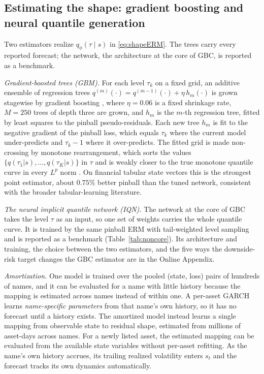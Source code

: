 \documentclass[11pt]{article}
\theoremstyle{remark}
\begin{document}
\subsection{Estimating the shape: gradient boosting and neural quantile
generation}\label{sec:gbcmethod}

Two estimators realize $q_\phi(\tau\mid s)$ in \eqref{eq:shapeERM}. The
trees carry every reported forecast; the network, the architecture at
the core of GBC, is reported as a benchmark.

\emph{Gradient-boosted trees (GBM).} For each level $\tau_k$ on a fixed grid, an additive ensemble of regression trees $q^{(m)}(\cdot) = q^{(m-1)}(\cdot) + \eta\, h_m(\cdot)$ is grown stagewise by gradient boosting \citep{friedman2001}, where $\eta=0.06$ is a fixed shrinkage rate, $M=250$ trees of depth three are grown, and $h_m$ is the $m$-th regression tree, fitted by least squares to the pinball pseudo-residuals. Each new tree $h_m$ is fit to the negative gradient of the pinball loss, which equals $\tau_k$ where the current model under-predicts and $\tau_k - 1$ where it over-predicts. The fitted grid is made non-crossing by monotone rearrangement, which sorts the values $\{q(\tau_1|s),\dots,q(\tau_K|s)\}$ in $\tau$ and is weakly closer to the true monotone quantile curve in every $L^p$ norm \citep{cherno2010rearr}. On financial tabular state
vectors this is the strongest point estimator, about $0.75\%$ better pinball than the tuned network, consistent with the broader
tabular-learning literature.

\emph{The neural implicit quantile network (IQN).} The network at the core of GBC \citep{dabney2018iqn, polson2023gbc} takes the level $\tau$ as an input, so one set of weights carries the whole quantile curve. It is trained by the same pinball ERM with tail-weighted level sampling and is reported as a benchmark (Table~\ref{tab:noncore}). Its architecture and training, the choice between the two estimators, and the five ways the downside-risk target changes the GBC estimator are in the Online Appendix.

\emph{Amortization.} One model is trained over the pooled (state, loss)
pairs of hundreds of names, and it can be evaluated for a name with little history because the mapping is estimated across names instead of within one. A per-asset
GARCH learns \emph{name-specific parameters} from that name's own
history, so it has no forecast until a history exists. The amortized model instead
learns a single mapping from observable state to residual shape,
estimated from millions of asset-days across names. For a newly listed asset, the estimated mapping can be evaluated from the available state variables without per-asset refitting. As
the name's own history accrues, its trailing realized volatility enters
$s_t$ and the forecast tracks its own dynamics automatically.
\end{document}
